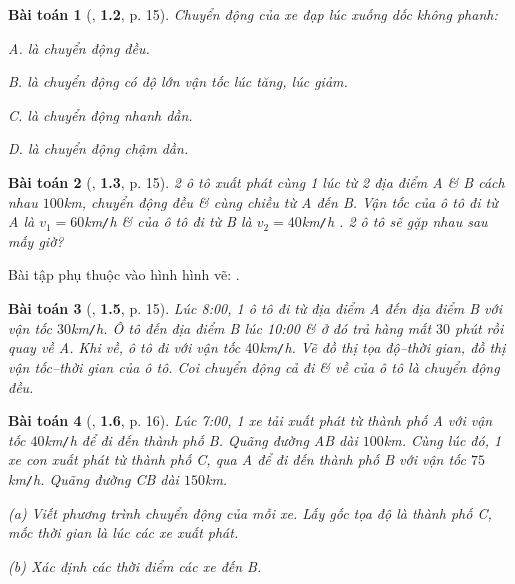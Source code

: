 \documentclass{article}
\numberwithin{equation}{section}
\newtheorem{baitoan}{Bài toán}[section]
\begin{document}
\begin{baitoan}[\cite{Thinh_Lua2021}, \textbf{1.2}, p. 15]
	Chuyển động của xe đạp lúc xuống dốc không phanh:
	\begin{enumerate*}
		\item[{\rm\sf A.}] là chuyển động đều.
		\item[{\rm\sf B.}] là chuyển động có độ lớn vận tốc lúc tăng, lúc giảm.
		\item[{\rm\sf C.}] là chuyển động nhanh dần.
		\item[{\rm\sf D.}] là chuyển động chậm dần.
	\end{enumerate*}
\end{baitoan}

\begin{baitoan}[\cite{Thinh_Lua2021}, \textbf{1.3}, p. 15]
	2 ô tô xuất phát cùng 1 lúc từ 2 địa điểm A \& B cách nhau $100$\emph{km}, chuyển động đều \& cùng chiều từ A đến B. Vận tốc của ô tô đi từ A là $v_1 = 60$\emph{km\texttt{/}h} \& của ô tô đi từ B là $v_2 = 40$\emph{km\texttt{/}h} . 2 ô tô sẽ gặp nhau sau mấy giờ?
\end{baitoan}
Bài tập phụ thuộc vào hình hình vẽ: \cite[\textbf{1.4.}, p. 15, \textbf{1.7.}--\textbf{1.8}, p. 16]{Thinh_Lua2021}.

\begin{baitoan}[\cite{Thinh_Lua2021}, \textbf{1.5}, p. 15]
	Lúc 8:00, 1 ô tô đi từ địa điểm A đến địa điểm B với vận tốc $30$\emph{km\texttt{/}h}. Ô tô đến địa điểm B lúc 10:00 \& ở đó trả hàng mất $30$ phút rồi quay về A. Khi về, ô tô đi với vận tốc $40$\emph{km\texttt{/}h}. Vẽ đồ thị tọa độ--thời gian, đồ thị vận tốc--thời gian của ô tô. Coi chuyển động cả đi \& về của ô tô là chuyển động đều.
\end{baitoan}

\begin{baitoan}[\cite{Thinh_Lua2021}, \textbf{1.6}, p. 16]
	Lúc 7:00, 1 xe tải xuất phát từ thành phố A với vận tốc $40$\emph{km\texttt{/}h} để đi đến thành phố B. Quãng đường AB dài $100$\emph{km}. Cùng lúc đó, 1 xe con xuất phát từ thành phố C, qua A để đi đến thành phố B với vận tốc $75$\emph{km\texttt{/}h}. Quãng đường CB dài $150$\emph{km}.
	\begin{enumerate*}
		\item[(a)] Viết phương trình chuyển động của mỗi xe. Lấy gốc tọa độ là thành phố C, mốc thời gian là lúc các xe xuất phát.
		\item[(b)] Xác định các thời điểm các xe đến B.
	\end{enumerate*}
\end{baitoan}
\end{document}
